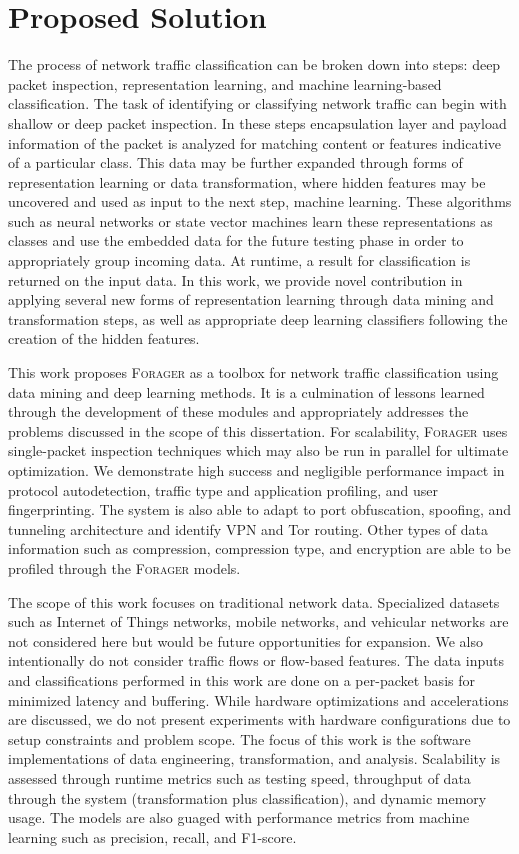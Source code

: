 \section{Proposed Solution}

The process of network traffic classification can be broken down into steps: deep packet inspection, representation learning, and machine learning-based classification. The task of identifying or classifying network traffic can begin with shallow or deep packet inspection. In these steps encapsulation layer and payload information of the packet is analyzed for matching content or features indicative of a particular class. This data may be further expanded through forms of representation learning or data transformation, where hidden features may be uncovered and used as input to the next step, machine learning. These algorithms such as neural networks or state vector machines learn these representations as classes and use the embedded data for the future testing phase in order to appropriately group incoming data. At runtime, a result for classification is returned on the input data. In this work, we provide novel contribution in applying several new forms of representation learning through data mining and transformation steps, as  well as appropriate deep learning classifiers following the creation of the hidden features.

This work proposes \textsc{Forager} as a toolbox for network traffic classification using data mining and deep learning methods. It is a culmination of lessons learned through the development of these modules and appropriately addresses the problems discussed in the scope of this dissertation. For scalability, \textsc{Forager} uses single-packet inspection techniques which may also be run in parallel for ultimate optimization. We demonstrate high success and negligible performance impact in protocol autodetection, traffic type and application profiling, and user fingerprinting. The system is also able to adapt to port obfuscation, spoofing, and tunneling architecture and identify VPN and Tor routing. Other types of data information such as compression, compression type, and encryption are able to be profiled through the \textsc{Forager} models.

The scope of this work focuses on traditional network data. Specialized datasets such as Internet of Things networks, mobile networks, and vehicular networks are not considered here but would be future opportunities for expansion. We also intentionally do not consider traffic flows or flow-based features. The data inputs and classifications performed in this work are done on a per-packet basis for minimized latency and buffering. While hardware optimizations and accelerations are discussed, we do not present experiments with hardware configurations due to setup constraints and problem scope. The focus of this work is the software implementations of data engineering, transformation, and analysis. Scalability is assessed through runtime metrics such as testing speed, throughput of data through the system (transformation plus classification), and dynamic memory usage. The models are also guaged with performance metrics from machine learning such as precision, recall, and F1-score.

